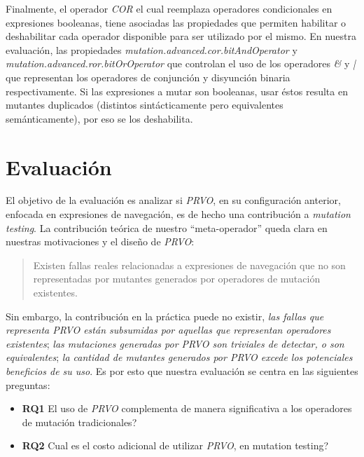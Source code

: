 Finalmente, el operador \emph{COR} el cual reemplaza operadores condicionales en expresiones booleanas, tiene asociadas las propiedades que permiten habilitar o deshabilitar cada operador disponible para ser utilizado por el mismo. En nuestra evaluaci\'on, las propiedades \emph{mutation.advanced.cor.bitAndOperator} y \emph{mutation.advanced.ror.bitOrOperator} que controlan el uso de los operadores \emph{\&} y \emph{|} que representan los operadores de conjunci\'on y disyunci\'on binaria respectivamente. Si las expresiones a mutar son booleanas, usar \'estos resulta en mutantes duplicados (distintos sint\'acticamente pero equivalentes sem\'anticamente), por eso se los deshabilita.

\section{Evaluaci\'on}
\label{sec:evaluation.evaluation}

El objetivo de la evaluaci\'on es analizar si \emph{PRVO}, en su configuraci\'on anterior, enfocada en expresiones de navegaci\'on, es de hecho una contribuci\'on a \emph{mutation testing}. La contribuci\'on te\'orica de nuestro ``meta-operador'' queda clara en nuestras motivaciones y el dise\~no de \emph{PRVO}:
\begin{quote}
  Existen fallas reales relacionadas a expresiones de navegaci\'on que no son representadas por mutantes generados por operadores de mutaci\'on existentes.
\end{quote}
Sin embargo, la contribuci\'on en la pr\'actica puede no existir, \emph{las fallas que representa PRVO est\'an subsumidas por aquellas que representan operadores existentes}; \emph{las mutaciones generadas por PRVO son triviales de detectar, o son equivalentes}; \emph{la cantidad de mutantes generados por PRVO excede los potenciales beneficios de su uso}. Es por esto que nuestra evaluaci\'on se centra en las siguientes preguntas:
\begin{itemize}
	\item \textbf{RQ1} El uso de \emph{PRVO} complementa de manera significativa a los operadores de mutaci\'on tradicionales?
	
	\item \textbf{RQ2} Cual es el costo adicional de utilizar \emph{PRVO}, en mutation testing?
\end{itemize}

